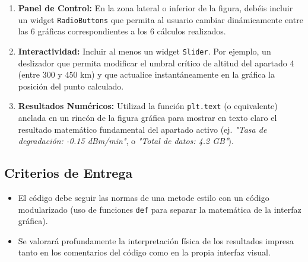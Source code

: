 	\begin{enumerate}
		\item \textbf{Panel de Control:} En la zona lateral o inferior de la figura, debéis incluir un widget \texttt{RadioButtons} que permita al usuario cambiar dinámicamente entre las 6 gráficas correspondientes a los 6 cálculos realizados.
		\item \textbf{Interactividad:} Incluir al menos un widget \texttt{Slider}. Por ejemplo, un deslizador que permita modificar el umbral crítico de altitud del apartado 4 (entre $300$ y $450\text{ km}$) y que actualice instantáneamente en la gráfica la posición del punto calculado.
		\item \textbf{Resultados Numéricos:} Utilizad la función \texttt{plt.text} (o equivalente) anclada en un rincón de la figura gráfica para mostrar en texto claro el resultado matemático fundamental del apartado activo (ej. \textit{"Tasa de degradación: -0.15 dBm/min"}, o \textit{"Total de datos: 4.2 GB"}).
	\end{enumerate}
	
	\subsection*{Criterios de Entrega}
	\begin{itemize}
		
		\item El código debe seguir las normas 
		de una metode estilo con un código modularizado 
		(uso de funciones \texttt{def} para separar la matemática 
		de la interfaz gráfica).
		\item Se valorará profundamente 
		la interpretación física de los resultados 
		impresa tanto en los comentarios del código como en la propia interfaz visual.
	\end{itemize}